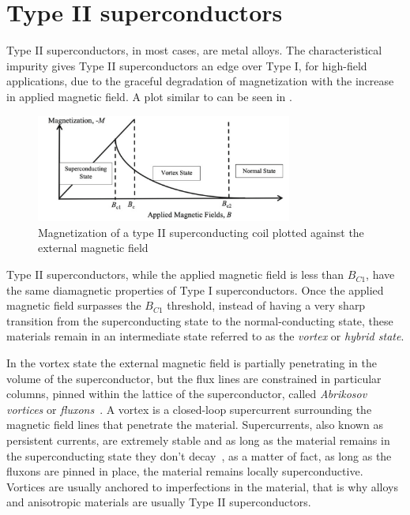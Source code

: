 \section{Type II superconductors}
\label{sec:type2}
Type II superconductors, in most cases, are metal alloys. The characteristical impurity gives Type II superconductors an edge
over Type I, for high-field applications, due to the graceful degradation of magnetization with the increase in applied magnetic
field. A plot similar to  can be seen in .
\begin{figure}[!ht]
	\centering
	\includegraphics[width=0.75\textwidth]{./img/type2.png}
	\caption{Magnetization of a type II superconducting coil plotted against the external
		magnetic field~\cite{slimani2022superconducting}}
	\label{img:type2-transition}
\end{figure}

Type II superconductors, while the applied magnetic field is less than $B_{C1}$, have the same
diamagnetic properties of Type I superconductors. Once the applied magnetic field surpasses the
$B_{C1}$ threshold, instead of having a very sharp transition from the superconducting state to
the normal-conducting state, these materials remain in an intermediate state referred to as the \emph{vortex} or \emph{hybrid state}.

In the vortex state the external magnetic field is partially penetrating in the volume of the superconductor, but the
flux lines are constrained in particular columns, pinned within the lattice of the
superconductor, called \emph{Abrikosov vortices} or \emph{fluxons}~\cite{abrikosov-vortices}.
A vortex is a closed-loop supercurrent surrounding the magnetic field lines that
penetrate the material. Supercurrents, also known as persistent currents, are extremely stable and as long as the material remains in the
superconducting state they don't decay~\cite{fujita-theory-HTS, file1963}, as a matter of fact, as long as the
fluxons are pinned in place, the material remains locally superconductive. Vortices are usually anchored to imperfections in the material, that is why alloys and anisotropic materials are usually Type II superconductors.


